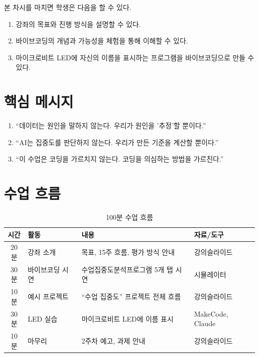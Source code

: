 \documentclass[11pt, a4paper]{article}
\begin{document}
본 차시를 마치면 학생은 다음을 할 수 있다.

\begin{enumerate}
    \item 강좌의 목표와 진행 방식을 설명할 수 있다.
    \item 바이브코딩의 개념과 가능성을 체험을 통해 이해할 수 있다.
    \item 마이크로비트 LED에 자신의 이름을 표시하는 프로그램을 바이브코딩으로 만들 수 있다.
\end{enumerate}

\section{핵심 메시지}

\begin{keypoint}
\begin{enumerate}
    \item ``데이터는 원인을 말하지 않는다. 우리가 원인을 '추정'할 뿐이다.''
    \item ``AI는 집중도를 판단하지 않는다. 우리가 만든 기준을 계산할 뿐이다.''
    \item ``이 수업은 코딩을 가르치지 않는다. 코딩을 의심하는 방법을 가르친다.''
\end{enumerate}
\end{keypoint}

\section{수업 흐름}

\begin{table}[H]
\centering
\begin{tabularx}{\textwidth}{c l X l}
\toprule
\textbf{시간} & \textbf{활동} & \textbf{내용} & \textbf{자료/도구} \\
\midrule
20분 & 강좌 소개 & 목표, 15주 흐름, 평가 방식 안내 & 강의슬라이드 \\
30분 & 바이브코딩 시연 & 수업집중도분석프로그램 5개 탭 시연 & 시뮬레이터 \\
10분 & 예시 프로젝트 & ``수업 집중도'' 프로젝트 전체 흐름 & 강의슬라이드 \\
30분 & LED 실습 & 마이크로비트 LED에 이름 표시 & MakeCode, Claude \\
10분 & 마무리 & 2주차 예고, 과제 안내 & 강의슬라이드 \\
\bottomrule
\end{tabularx}
\caption{100분 수업 흐름}
\end{table}
\end{document}
